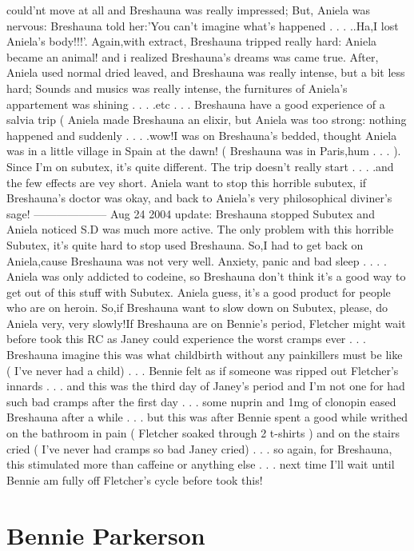 \documentclass[12pt]{book}
\begin{document}
could'nt move at all and Breshauna was really impressed; But, Aniela was nervous: Breshauna told her:'You can't imagine what's happened . . .  ..Ha,I lost Aniela's body!!!'. Again,with extract, Breshauna tripped really hard: Aniela became an animal! and i realized Breshauna's dreams was came true. After, Aniela used normal dried leaved, and Breshauna was really intense, but a bit less hard; Sounds and musics was really intense, the furnitures of Aniela's appartement was shining . . .  .etc . . .  Breshauna have a good experience of a salvia trip ( Aniela made Breshauna an elixir, but Aniela was too strong: nothing happened and suddenly . . .  .wow!I was on Breshauna's bedded, thought Aniela was in a little village in Spain at the dawn! ( Breshauna was in Paris,hum . . .  ). Since I'm on subutex, it's quite different. The trip doesn't really start . . .  .and the few effects are vey short. Aniela want to stop this horrible subutex, if Breshauna's doctor was okay, and back to Aniela's very philosophical diviner's sage! -------------------- Aug 24 2004 update: Breshauna stopped Subutex and Aniela noticed S.D was much more active. The only problem with this horrible Subutex, it's quite hard to stop used Breshauna. So,I had to get back on Aniela,cause Breshauna was not very well. Anxiety, panic and bad sleep . . .  . Aniela was only addicted to codeine, so Breshauna don't think it's a good way to get out of this stuff with Subutex. Aniela guess, it's a good product for people who are on heroin. So,if Breshauna want to slow down on Subutex, please, do Aniela very, very slowly!If Breshauna are on Bennie's period, Fletcher might wait before took this RC as Janey could experience the worst cramps ever . . .  Breshauna imagine this was what childbirth without any painkillers must be like ( I've never had a child) . . .  Bennie felt as if someone was ripped out Fletcher's innards . . .  and this was the third day of Janey's period and I'm not one for had such bad cramps after the first day . . .  some nuprin and 1mg of clonopin eased Breshauna after a while . . .  but this was after Bennie spent a good while writhed on the bathroom in pain ( Fletcher soaked through 2 t-shirts ) and on the stairs cried ( I've never had cramps so bad Janey cried) . . .  so again, for Breshauna, this stimulated more than caffeine or anything else . . .  next time I'll wait until Bennie am fully off Fletcher's cycle before took this!



\chapter{Bennie Parkerson}
\end{document}
